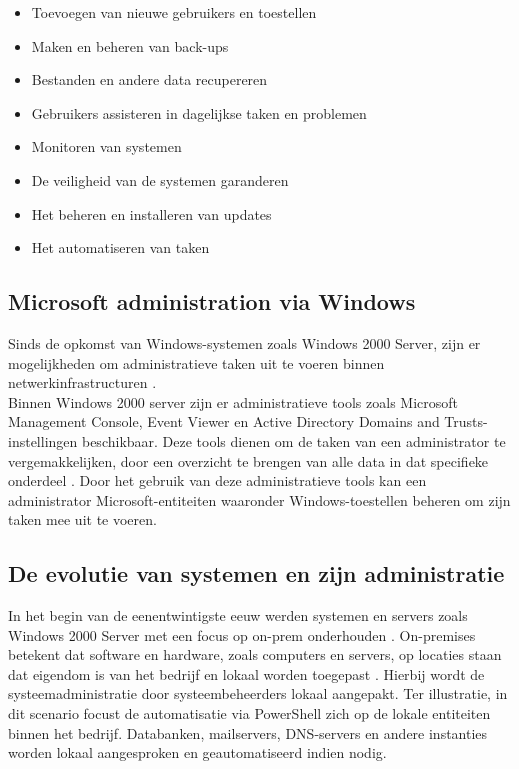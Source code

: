 \begin{itemize}
    \item Toevoegen van nieuwe gebruikers en toestellen
    \item Maken en beheren van back-ups
    \item Bestanden en andere data recupereren
    \item Gebruikers assisteren in dagelijkse taken en problemen
    \item Monitoren van systemen
    \item De veiligheid van de systemen garanderen
    \item Het beheren en installeren van updates
    \item Het automatiseren van taken
\end{itemize} 

\subsection{Microsoft administration via Windows}


Sinds de opkomst van Windows-systemen zoals Windows 2000 Server, zijn er mogelijkheden om administratieve taken uit te voeren binnen netwerkinfrastructuren \autocite{Tulloch2001}. \\

Binnen Windows 2000 server zijn er administratieve tools zoals Microsoft Management Console, Event Viewer en Active Directory Domains and Trusts-instellingen beschikbaar. Deze tools dienen om de taken van een administrator te vergemakkelijken, door een overzicht te brengen van alle data in dat specifieke onderdeel \autocite{Sibisi2022}. Door het gebruik van deze administratieve tools kan een administrator Microsoft-entiteiten waaronder Windows-toestellen beheren om zijn taken mee uit te voeren. 

\subsection{De evolutie van systemen en zijn administratie}


In het begin van de eenentwintigste eeuw werden systemen en servers zoals Windows 2000 Server met een focus op \ac{on-prem} onderhouden \autocite{Microsoft2022a}. On-premises betekent dat software en hardware, zoals computers en servers, op locaties staan dat eigendom is van het bedrijf en lokaal worden toegepast \autocite{Gastermann2015}. Hierbij wordt de systeemadministratie door systeembeheerders lokaal aangepakt. Ter illustratie, in dit scenario focust de automatisatie via PowerShell zich op de lokale entiteiten binnen het bedrijf. Databanken, mailservers, \ac{DNS}-servers en andere instanties worden lokaal aangesproken en geautomatiseerd indien nodig. \\

